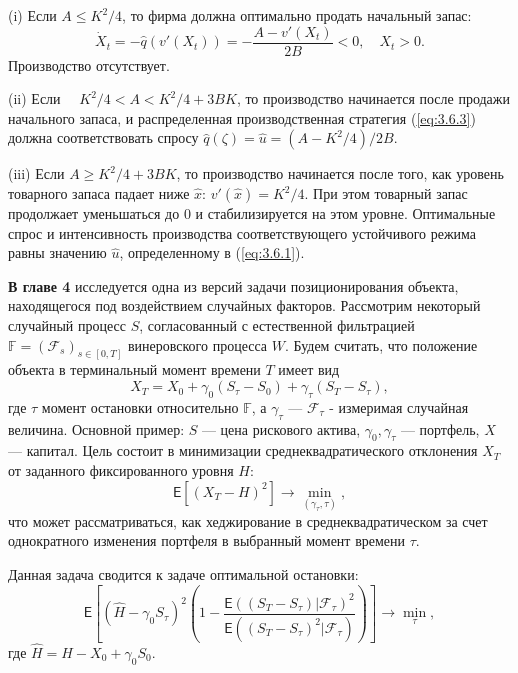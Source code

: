 (i) Если $A\le K^2/4$, то фирма должна оптимально продать начальный запас:
$$ \dot X_t=-\widehat q(v'(X_t))=-\frac{A-v'(X_t)}{2B}<0,\quad X_t>0.$$
Производство отсутствует.

(ii) Если $\quad K^2/4<A< K^2/4+3BK$, то производство начинается после продажи начального запаса, и распределенная производственная стратегия (\ref{eq:3.6.3}) должна соответствовать спросу $\widehat q(\zeta)=\widehat u=(A-K^2/4)/2B$.

(iii) Если $A\ge K^2/4+3BK$, то производство начинается после того, как уровень товарного запаса падает ниже $\widehat x$: $v'(\widehat x)=K^2/4$. При этом товарный запас продолжает уменьшаться до $0$ и стабилизируется на этом уровне. Оптимальные спрос и интенсивность производства соответствующего устойчивого режима равны значению $\widehat u$, определенному в (\ref{eq:3.6.1}).


\textbf{В главе 4} исследуется одна из версий задачи позиционирования объекта, находящегося под воздействием случайных факторов.
Рассмотрим некоторый случайный процесс $S$, согласованный с естественной фильтрацией $\mathbb F=(\mathscr F_s)_{s\in [0,T]}$ винеровского процесса $W$. Будем считать, что положение объекта в терминальный момент времени $T$ имеет вид
$$X_T = X_0+\gamma_0(S_\tau-S_0) +\gamma_\tau(S_T-S_\tau),$$
где $\tau$ момент остановки относительно $\mathbb F$, а $\gamma_\tau $ --- $\mathscr F_\tau$ - измеримая случайная величина. Основной пример: $S$ --- цена рискового актива, $\gamma_0, \gamma_\tau$ --- портфель, $X$ --- капитал. Цель состоит в минимизации среднеквадратического отклонения $X_T$ от заданного фиксированного уровня $H$:
\begin{equation}
\label{eq:4.1.1}
\mathsf E[(X_T-H)^2] \to \min_{(\gamma_\tau,\tau)},
\end{equation}
что может рассматриваться, как хеджирование в среднеквадратическом за счет однократного изменения портфеля в выбранный момент времени $\tau$.

Данная задача сводится к задаче оптимальной остановки:
\begin{equation}
\label{eq:4.1.4}
\mathsf E\left[(\widehat H - \gamma_0 S_\tau)^2 \left( 1-\frac{\mathsf E((S_T-S_\tau) | \mathscr F_\tau)^2}{\mathsf E((S_T-S_\tau)^2 | \mathscr F_\tau)}\right)\right] \to \min_{\tau},
\end{equation}
где $\widehat H = H-X_0+\gamma_0 S_0$.

